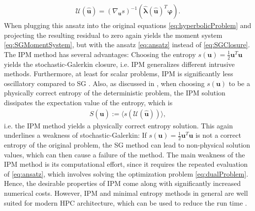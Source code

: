 \begin{align}\label{eq:ansatz}
 \mathcal{U}(\bm{\hat u}) = \left( \nabla_{\bm{u}} s \right)^{-1}(\bm{\hat{\lambda}}(\bm{\hat u})^T \bm{\varphi}).
\end{align}
When plugging this ansatz into the original equations \eqref{eq:hyperbolicProblem} and projecting the resulting residual to zero again yields the moment system \eqref{eq:SGMomentSystem}, but with the ansatz \eqref{eq:ansatz} instead of \eqref{eq:SGClosure}. The IPM method has several advantages: Choosing the entropy $s(\bm{u}) = \frac{1}{2}\bm{u}^T\bm{u}$ yields the stochastic-Galerkin closure, i.e. IPM generalizes different intrusive methods. Furthermore, at least for scalar problems, IPM is significantly less oscillatory compared to SG \cite{kusch2017maximum}. Also, as discussed in \cite{poette2009uncertainty}, when choosing $s(\bm u)$ to be a physically correct entropy of the deterministic problem, the IPM solution dissipates the expectation value of the entropy, which is
\begin{align*}
S(\bm{\hat u}) := \langle s( \mathcal{U}(\bm{\hat u}))\rangle,
\end{align*}
i.e. the IPM method yields a physically correct entropy solution. This again underlines a weakness of stochastic-Galerkin: If $s(\bm{u}) = \frac{1}{2}\bm{u}^T\bm{u}$ is not a correct entropy of the original problem, the SG method can lead to non-physical solution values, which can then cause a failure of the method. The main weakness of the IPM method is its computational effort, since it requires the repeated evaluation of \eqref{eq:ansatz}, which involves solving the optimization problem \eqref{eq:dualProblem}. Hence, the desirable properties of IPM come along with significantly increased numerical costs. However, IPM and minimal entropy methods in general are well suited for modern HPC architecture, which can be used to reduce the run time \cite{garrett2015optimization}. 

